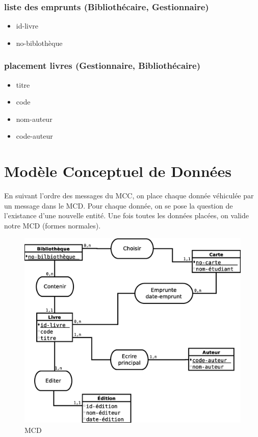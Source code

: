 \subsubsection*{liste des emprunts (Bibliothécaire, Gestionnaire)}
\begin{itemize}
    \item id-livre
    \item no-biblothèque
\end{itemize}

\subsubsection*{placement livres (Gestionnaire, Bibliothécaire)}
\begin{itemize}
    \item titre
    \item code
    \item nom-auteur
    \item code-auteur
\end{itemize}

\newpage
\section*{Modèle Conceptuel de Données}

En suivant l'ordre des messages du MCC, on place chaque donnée véhiculée par un message dans le MCD. Pour chaque donnée, on se pose la question de l'existance d'une nouvelle entité. Une fois toutes les données placées, on valide notre MCD (formes normales).

\begin{figure}[!htb]
    \begin{center}
    \includegraphics[width=11.5cm]{images/cc2_mcd.eps}
    \caption{\label{cc2_mcd} MCD}
    \end{center}
\end{figure}

